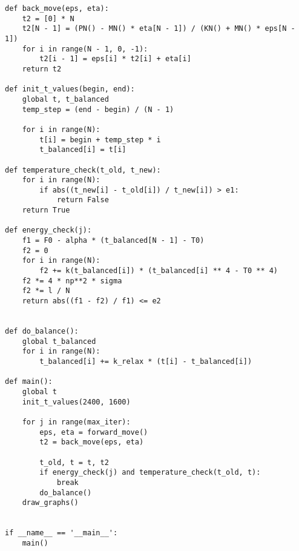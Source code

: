 \begin{lstlisting}[label=code1, caption = Лабораторная работа №3]
def back_move(eps, eta):
	t2 = [0] * N
	t2[N - 1] = (PN() - MN() * eta[N - 1]) / (KN() + MN() * eps[N - 1])
	for i in range(N - 1, 0, -1):
		t2[i - 1] = eps[i] * t2[i] + eta[i]
	return t2

def init_t_values(begin, end):
	global t, t_balanced
	temp_step = (end - begin) / (N - 1)
	
	for i in range(N):
		t[i] = begin + temp_step * i
		t_balanced[i] = t[i]

def temperature_check(t_old, t_new):
	for i in range(N):
		if abs((t_new[i] - t_old[i]) / t_new[i]) > e1:
			return False
	return True

def energy_check(j):
	f1 = F0 - alpha * (t_balanced[N - 1] - T0)
	f2 = 0
	for i in range(N):
		f2 += k(t_balanced[i]) * (t_balanced[i] ** 4 - T0 ** 4)
	f2 *= 4 * np**2 * sigma
	f2 *= l / N
	return abs((f1 - f2) / f1) <= e2


def do_balance():
	global t_balanced
	for i in range(N):
		t_balanced[i] += k_relax * (t[i] - t_balanced[i])

def main():
	global t
	init_t_values(2400, 1600)
	
	for j in range(max_iter):
		eps, eta = forward_move()
		t2 = back_move(eps, eta)
		
		t_old, t = t, t2
		if energy_check(j) and temperature_check(t_old, t):
			break
		do_balance()
	draw_graphs()


if __name__ == '__main__':
	main()
\end{lstlisting}